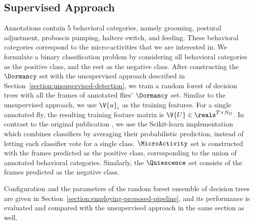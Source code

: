 \subsection{Supervised Approach}\label{section:supervised-detection}
Annotations contain 5 behavioral categories, namely grooming, postural adjustment, proboscis pumping, haltere switch, and feeding.
These behavioral categories correspond to the micro-activities that we are interested in.
We formulate a binary classification problem by considering all behavioral categories as the positive class, and the rest as the negative class.
After constructing the $\Dormancy$ set with the unsupervised approach described in Section~\ref{section:unsupervised-detection}, we train a random forest of decision trees \citep{breiman_random_2001} with all the frames of annotated flies' $\Dormancy$ set.
Similar to the unsupervised approach, we use $\V{u}_i$ as the training features.
For a single annotated fly, the resulting training feature matrix is $\V{U} \in \reals^{T \times N_G}$.
In contrast to the original publication \citep{breiman_random_2001}, we use the Scikit-learn \citep{pedregosa_scikit-learn_2011} implementation which combines classifiers by averaging their probabilistic prediction, instead of letting each classifier vote for a single class.
$\MicroActivity$ set is constructed with the frames predicted as the positive class, corresponding to the union of annotated behavioral categories. Similarly, the $\Quiescence$ set consists of the frames predicted as the negative class.

Configuration and the parameters of the random forest ensemble of decision trees are given in Section~\ref{section:employing-proposed-pipeline}, and its performance is evaluated and compared with the unsupervised approach in the same section as well.
